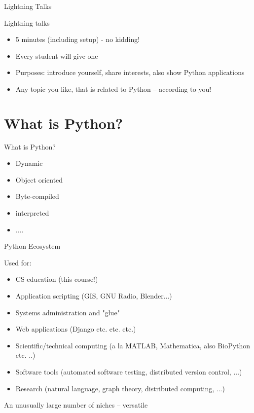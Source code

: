 \documentclass{beamer}
\begin{document}
\begin{frame}{Lightning Talks}

{\Large Lightning talks}
\begin{itemize}
   \item 5 minutes (including setup) - no kidding!
   \item Every student will give one
   \item Purposes: introduce yourself, share interests, also show Python applications
   \item Any topic you like, that is related to Python -- according to you!
\end{itemize}
\end{frame}


\section{What is Python?}

\begin{frame}{What is Python?}
    \begin{itemize}
      \item Dynamic
      \item Object oriented
      \item Byte-compiled
      \item interpreted
      \item ....
    \end{itemize}
\end{frame}

\begin{frame}{Python Ecosystem}

{\Large Used for:} 
\begin{itemize}
  \item CS education (this course!)  
  \item Application scripting (GIS, GNU Radio, Blender...)
  \item Systems administration and "glue"
  \item Web applications (Django etc. etc. etc.)
  \item Scientific/technical computing (a la MATLAB, Mathematica, also BioPython etc. ..)
  \item Software tools (automated software testing, distributed version control, ...)
  \item Research (natural language, graph theory, distributed computing, ...)
\end{itemize}

 An unusually large number of niches -- versatile
\end{frame}
\end{document}
